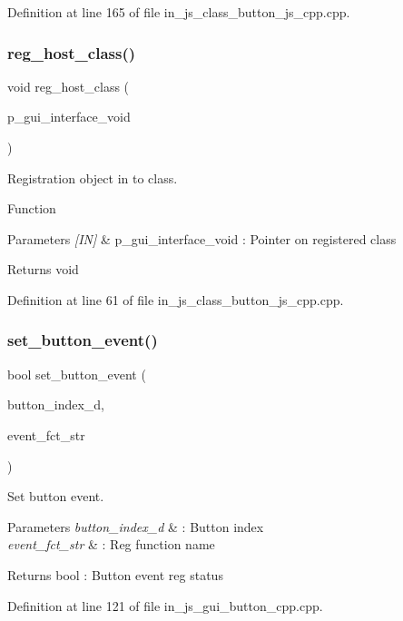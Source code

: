 Definition at line 165 of file in\+\_\+js\+\_\+class\+\_\+button\+\_\+js\+\_\+cpp.\+cpp.

\mbox{\label{group___button_gac715b4a43bb361fc96ce6f1b50d68a8b}} 
\subsubsection{reg\_host\_class()}
{\footnotesize\ttfamily void reg\+\_\+host\+\_\+class (\begin{DoxyParamCaption}\item[{void $\ast$}]{p\+\_\+gui\+\_\+interface\+\_\+void }\end{DoxyParamCaption})}



Registration object in to class. 

Function
\begin{DoxyParams}{Parameters}
{\em \mbox{[}\+I\+N\mbox{]}} & p\+\_\+gui\+\_\+interface\+\_\+void \+: Pointer on registered class \\
\hline
\end{DoxyParams}
\begin{DoxyReturn}{Returns}
void 
\end{DoxyReturn}


Definition at line 61 of file in\+\_\+js\+\_\+class\+\_\+button\+\_\+js\+\_\+cpp.\+cpp.

\mbox{\label{group___button_ga84e3f9fdd1672c20bfb0fe3aa6e5da0f}} 
\subsubsection{set\_button\_event()}
{\footnotesize\ttfamily bool set\+\_\+button\+\_\+event (\begin{DoxyParamCaption}\item[{double}]{button\+\_\+index\+\_\+d,  }\item[{wx\+String}]{event\+\_\+fct\+\_\+str }\end{DoxyParamCaption})}



Set button event. 


\begin{DoxyParams}{Parameters}
{\em button\+\_\+index\+\_\+d} & \+: Button index \\
\hline
{\em event\+\_\+fct\+\_\+str} & \+: Reg function name \\
\hline
\end{DoxyParams}
\begin{DoxyReturn}{Returns}
bool \+: Button event reg status 
\end{DoxyReturn}


Definition at line 121 of file in\+\_\+js\+\_\+gui\+\_\+button\+\_\+cpp.\+cpp.

